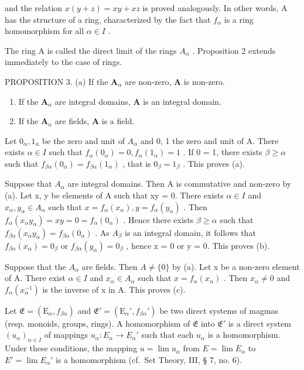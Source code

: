 and the relation \(x(y + z) = xy + xz\) is proved analogously. In other words, A has the structure of a ring, characterized by the fact that \(f_{\alpha}\) is a ring homomorphism for all \(\alpha \in I\) .

The ring A is called the direct limit of the rings \(A_{\alpha}\) . Proposition 2 extends immediately to the case of rings.

PROPOSITION 3. (a) If the \(\mathbf{A}_{\alpha}\) are non-zero, \(\mathbf{A}\) is non-zero.

\begin{enumerate}
\def\labelenumi{(\alph{enumi})}
\setcounter{enumi}{1}
\item
  If the \(\mathbf{A}_{\alpha}\) are integral domains, \(\mathbf{A}\) is an integral domain.
\item
  If the \(\mathbf{A}_{\alpha}\) are fields, \(\mathbf{A}\) is a field.
\end{enumerate}

Let \(0_{\alpha}, 1_{\alpha}\) be the zero and unit of \(A_{\alpha}\) and 0, 1 the zero and unit of A. There exists \(\alpha \in I\) such that \(f_{\alpha}(0_{\alpha}) = 0, f_{\alpha}(1_{\alpha}) = 1\) . If 0 = 1, there exists \(\beta \geqslant \alpha\) such that \(f_{\beta \alpha}(0_{\alpha}) = f_{\beta \alpha}(1_{\alpha})\) , that is \(0_{\beta} = 1_{\beta}\) . This proves (a).

Suppose that \(A_{\alpha}\) are integral domains. Then A is commutative and non-zero by (a). Let x, y be elements of A such that xy = 0. There exists \(\alpha \in I\) and \(x_{\alpha}, y_{\alpha} \in A_{\alpha}\) such that \(x = f_{\alpha}(x_{\alpha}), y = f_{\alpha}(y_{\alpha})\) . Then \(f_{\alpha}(x_{\alpha}y_{\alpha}) = xy = 0 = f_{\alpha}(0_{\alpha})\) . Hence there exists \(\beta \geqslant \alpha\) such that \(f_{\beta\alpha}(x_{\alpha}y_{\alpha}) = f_{\beta\alpha}(0_{\alpha})\) . As \(A_{\beta}\) is an integral domain, it follows that \(f_{\beta\alpha}(x_{\alpha}) = 0_{\beta}\) or \(f_{\beta\alpha}(y_{\alpha}) = 0_{\beta}\) , hence x = 0 or y = 0. This proves (b).

Suppose that the \(A_{\alpha}\) are fields. Then \(A \neq \{0\}\) by (a). Let x be a non-zero element of A. There exist \(\alpha \in I\) and \(x_{\alpha} \in A_{\alpha}\) such that \(x = f_{\alpha}(x_{\alpha})\) . Then \(x_{\alpha} \neq 0\) and \(f_{\alpha}(x_{\alpha}^{-1})\) is the inverse of x in A. This proves (c).

Let \(\mathfrak{E} = (\mathrm{E}_{\alpha}, f_{\beta \alpha})\) and \(\mathfrak{E}' = (\mathrm{E}_{\alpha}', f_{\beta \alpha}')\) be two direct systems of magmas (resp. monoids, groups, rings). A homomorphism of \(\mathfrak{E}\) into \(\mathfrak{E}'\) is a direct system \((u_{\alpha})_{\alpha \in I}\) of mappings \(u_{\alpha} \colon E_{\alpha} \to E_{\alpha}'\) such that each \(u_{\alpha}\) is a homomorphism. Under these conditions, the mapping \(u = \lim u_{\alpha}\) from \(E = \lim E_{\alpha}\) to \(E' = \lim E_{\alpha}'\) is a homomorphism (cf.~Set Theory, III, § 7, no. 6).

